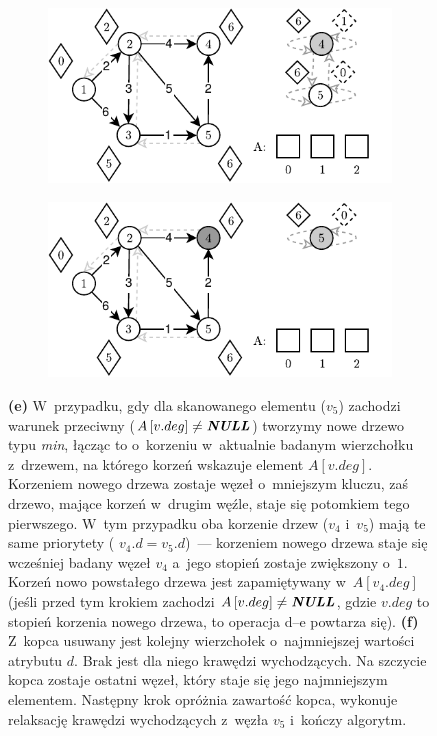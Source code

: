 \begin{figure}[!htbp]
	\ContinuedFloat
	\centering
	\begin{subfigure}[b]{0.45\textwidth}
		\includegraphics[width=\textwidth]{Chapter_II/FIBONACCI-Example/e.pdf}
		\caption{}
	\end{subfigure}%
	\begin{subfigure}[b]{0.45\textwidth}
		\includegraphics[width=\textwidth]{Chapter_II/FIBONACCI-Example/f.pdf}
		\caption{}
	\end{subfigure}
	\caption{ \textbf{(e)} W~przypadku, gdy dla skanowanego elementu ($v_{5}$) zachodzi warunek przeciwny ($A \left[ v.deg \right] \neq \emph{\textbf{NULL}} $) tworzymy nowe drzewo typu \textit{min}, łącząc to o~korzeniu w~aktualnie badanym wierzchołku z~drzewem, na którego korzeń wskazuje element $A \left[ v.deg \right]$. Korzeniem nowego drzewa zostaje węzeł o~mniejszym kluczu, zaś drzewo, mające korzeń w~drugim węźle, staje się potomkiem tego pierwszego. W~tym przypadku oba korzenie drzew ($v_{4}$ i~$v_{5}$) mają te same priorytety ( $v_{4}.d = v_{5}.d$)~--- korzeniem nowego drzewa staje się wcześniej badany węzeł $v_{4}$ a~jego stopień zostaje zwiększony o~$1$. Korzeń nowo powstałego drzewa jest zapamiętywany w~$A \left[ v_{4}.deg \right]$ (jeśli przed tym krokiem zachodzi $A \left[ v.deg \right] \neq \emph{\textbf{NULL}} $, gdzie $v.deg$ to stopień korzenia nowego drzewa, to operacja d--e powtarza się). \textbf{(f)} Z~kopca usuwany jest kolejny wierzchołek o~najmniejszej wartości atrybutu $d$. Brak jest dla niego krawędzi wychodzących. Na szczycie kopca zostaje ostatni węzeł, który staje się jego najmniejszym elementem. Następny krok opróżnia zawartość kopca, wykonuje relaksację krawędzi wychodzących z~węzła $v_{5}$ i~kończy algorytm. } \label{fig:exampleFibonacci2}
\end{figure}

